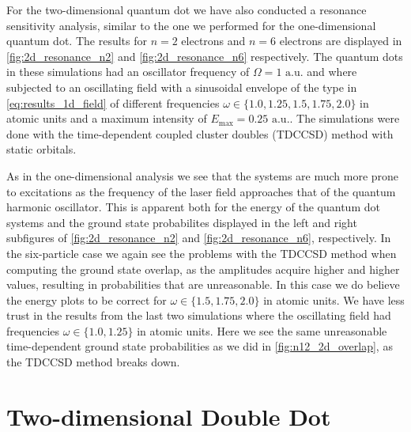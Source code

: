 For the two-dimensional quantum dot we have also conducted a resonance sensitivity analysis,
similar to the one we performed for the one-dimensional quantum dot. The results for 
$n=2$ electrons and $n=6$ electrons are displayed in \autoref{fig:2d_resonance_n2}
and \autoref{fig:2d_resonance_n6} respectively. The quantum dots in these simulations 
had an oscillator frequency of $\Omega=1 \text{ a.u.}$ and where subjected to an oscillating 
field with a sinusoidal envelope of the type in \autoref{eq:results_1d_field} of 
different frequencies $\omega\in\{1.0,1.25,1.5,1.75,2.0\}$ in atomic units and a maximum intensity of 
$E_\text{max}=0.25 \text{ a.u.}$. The simulations were done with the time-dependent coupled 
cluster doubles (TDCCSD) method with static orbitals.

As in the one-dimensional analysis we see that the systems are much more prone to 
excitations as the frequency of the laser field approaches that of the quantum harmonic 
oscillator. This is apparent both for the energy of the quantum dot systems and the 
ground state probabilites displayed in the left and right subfigures of
\autoref{fig:2d_resonance_n2} and \autoref{fig:2d_resonance_n6}, respectively. In the 
six-particle case we again see the problems with the TDCCSD method when computing the 
ground state overlap, as the amplitudes acquire higher and higher values, resulting 
in probabilities that are unreasonable. In this case we do believe the 
energy plots to be correct for $\omega\in\{1.5, 1.75,2.0\}$ in atomic units. 
We have less trust in the results from the last two simulations where the oscillating 
field had frequencies $\omega\in\{1.0, 1.25\}$ in atomic units.
Here we see the same unreasonable time-dependent 
ground state probabilities as we did in \autoref{fig:n12_2d_overlap}, as the 
TDCCSD method breaks down.


\section{Two-dimensional Double Dot}

